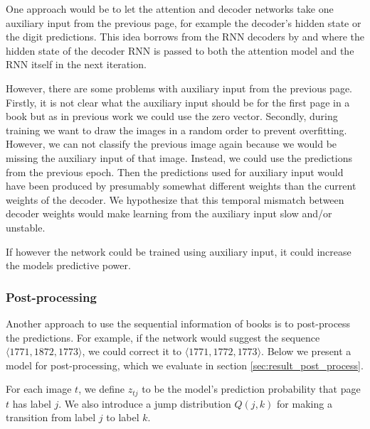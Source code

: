 One approach would be to let the attention and decoder networks take one auxiliary input from the previous page, for example the decoder's hidden state or the digit predictions. This idea borrows from the RNN decoders by \textcite{machine_translation_attention} and \textcite{AttendAndTell} where the hidden state of the decoder RNN is passed to both the attention model and the RNN itself in the next iteration.

However, there are some problems with auxiliary input from the previous page. Firstly, it is not clear what the auxiliary input should be for the first page in a book but as in previous work we could use the zero vector. Secondly, during training we want to draw the images in a random order to prevent overfitting. However, we can not classify the previous image again because we would be missing the auxiliary input of that image. Instead, we could use the predictions from the previous epoch. Then the predictions used for auxiliary input would have been produced by presumably somewhat different weights than the current weights of the decoder. We hypothesize that this temporal mismatch between decoder weights would make learning from the auxiliary input slow and/or unstable.

If however the network could be trained using auxiliary input, it could increase the models predictive power.

\subsubsection{Post-processing} \label{sssec:alt_postproc}

Another approach to use the sequential information of books is to post-process the predictions. For example, if the network would suggest the sequence $\langle 1771, 1872, 1773 \rangle$, we could correct it to $\langle 1771, 1772, 1773 \rangle$.
Below we present a model for post-processing, which we evaluate in section \ref{sec:result_post_process}.

For each image $t$, we define $z_{tj}$ to be the model's prediction probability that page $t$ has label $j$. We also introduce a jump distribution $Q(j, k)$ for making a transition from label $j$ to label $k$.

